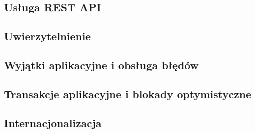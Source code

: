 
\subsection{Usługa REST API}




\subsection{Uwierzytelnienie}




\subsection{Wyjątki aplikacyjne i obsługa błędów}




\subsection{Transakcje aplikacyjne i blokady optymistyczne}




\subsection{Internacjonalizacja}
